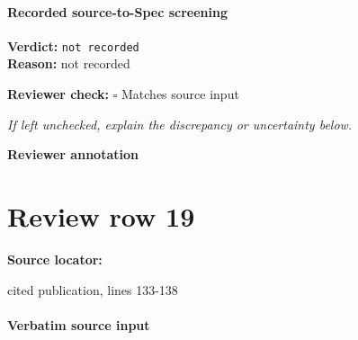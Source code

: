 \documentclass[10pt]{article}
\newcommand{\reviewerbox}{%
  \par\noindent\fbox{\parbox{0.96\linewidth}{\rule{0pt}{0.38in}}}\par
}
\newcommand{\reviewmatch}[1]{%
  \par\noindent\textbf{Reviewer check:} $\square$\; #1\par
  \noindent\emph{If left unchecked, explain the discrepancy or uncertainty below.}\par
}
\begin{document}
\paragraph{Recorded source-to-Spec screening}
\textbf{Verdict:} \texttt{not recorded}
\\
\textbf{Reason:} not recorded
\reviewmatch{Matches source input}
\noindent\textbf{Reviewer annotation}\par
\reviewerbox
\clearpage
\hypertarget{source-claim-fd702590ac30f669}{}
\section*{Review row 19}
\textbf{Source locator:} {\footnotesize\raggedright cited publication, lines 133-\allowbreak{}138\par}
\paragraph{Verbatim source input}
\end{document}
